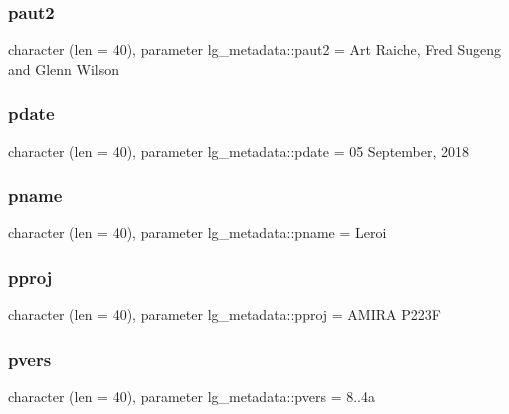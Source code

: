 \mbox{\label{namespacelg__metadata_a11648f65295df5ce798120d00e06cba9}} 
\subsubsection{\texorpdfstring{paut2}{paut2}}
{\footnotesize\ttfamily character (len = 40), parameter lg\+\_\+metadata\+::paut2 = \textquotesingle{}Art Raiche, Fred Sugeng and Glenn Wilson\textquotesingle{}}

\mbox{\label{namespacelg__metadata_a337b7eb616ab5604cf3aa962030f7d07}} 
\subsubsection{\texorpdfstring{pdate}{pdate}}
{\footnotesize\ttfamily character (len = 40), parameter lg\+\_\+metadata\+::pdate = \textquotesingle{}05 September, 2018\textquotesingle{}}

\mbox{\label{namespacelg__metadata_a55e96053795f7d02e8bbe4de8d6285c4}} 
\subsubsection{\texorpdfstring{pname}{pname}}
{\footnotesize\ttfamily character (len = 40), parameter lg\+\_\+metadata\+::pname = \textquotesingle{}Leroi\textquotesingle{}}

\mbox{\label{namespacelg__metadata_ad73468f9426cf993204325cabad1cf55}} 
\subsubsection{\texorpdfstring{pproj}{pproj}}
{\footnotesize\ttfamily character (len = 40), parameter lg\+\_\+metadata\+::pproj = \textquotesingle{}A\+M\+I\+RA P223F\textquotesingle{}}

\mbox{\label{namespacelg__metadata_ac903068c6379390ca35b58c1a7e92078}} 
\subsubsection{\texorpdfstring{pvers}{pvers}}
{\footnotesize\ttfamily character (len = 40), parameter lg\+\_\+metadata\+::pvers = \textquotesingle{}8..\+4a\textquotesingle{}}

